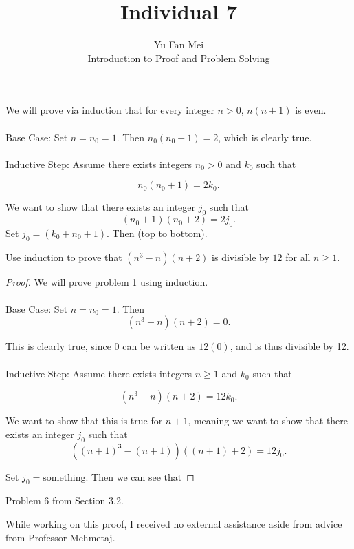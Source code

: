 \documentclass[12pt]{article}
\newenvironment{lemma}[2][Lemma]{\begin{trivlist}
\item[\hskip \labelsep {\bfseries #1}\hskip \labelsep {\bfseries #2.}]}{\end{trivlist}}
\newenvironment{problem}[2][Problem]{\begin{trivlist}
\item[\hskip \labelsep {\bfseries #1}\hskip \labelsep {\bfseries #2.}]}{\end{trivlist}}
\begin{document}

\title{Individual 7}%
\author{Yu Fan Mei\\ %
	Introduction to Proof and Problem Solving} %

\maketitle

\begin{lemma}{1}
    We will prove via induction that for every integer $n > 0$, $n(n+1)$ is even. \\ \\

    Base Case: Set $n = n_0 = 1$. Then $n_0(n_0+1) = 2$, which is clearly true. \\ \\
    Inductive Step: Assume there exists integers $n_0 > 0$ and $k_0$ such that

    $$n_0(n_0+1) = 2k_0.$$

    We want to show that there exists an integer $j_0$ such that
    $$(n_0+1)(n_0+2) = 2j_0.$$
    Set $j_0 = (k_0 + n_0 + 1)$. Then (top to bottom).

    

\end{lemma}

\begin{problem}{1}
    Use induction to prove that $(n^3 - n)(n + 2)$ is divisible by $12$ for all $n \geq 1$.
\end{problem}

\begin{proof} We will prove problem 1 using induction. \\ \\
    Base Case: Set $n = n_0 = 1$. Then
    $$(n^3 - n)(n + 2) = 0.$$

    This is clearly true, since 0 can be written as $12(0)$, and is thus divisible by 12. \\ \\

    Inductive Step: Assume there exists integers $n \geq 1$ and $k_0$ such that

    $$(n^3 - n)(n + 2) = 12k_0.$$

    We want to show that this is true for $n + 1$, meaning we want to show that there exists an integer $j_0$ such that
    $$((n+1)^3 - (n+1))((n+1) + 2) = 12j_0.$$

    Set $j_0 = \text{something}.$ Then we can see that


\end{proof}

\begin{problem}{2}
    Problem 6 from Section 3.2.
\end{problem}


\noindent While working on this proof, I received no external assistance aside from advice from Professor Mehmetaj.
\end{document}
